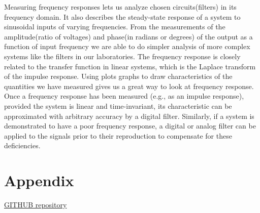 \documentclass[notitlepage, a4paper, 11pt]{article}
\begin{document}
	Measuring frequency responses lets us analyze chosen circuits(filters) in its frequency domain.	It also describes the steady-state response of a system to sinusoidal inputs of varying frequencies. From the measurements of the amplitude(ratio of voltages) and phase(in radians or degrees) of the output as a function of input frequency	we are able to do simpler analysis of more complex systems like the filters in our laboratories. The frequency response is closely related to the transfer function in linear systems, which is the Laplace transform of the impulse response. Using plots graphs to draw characteristics of the quantities we have measured gives us a great way to look at frequency response. Once a frequency response has been measured (e.g., as an impulse response), provided the system is linear and time-invariant, its characteristic can be approximated with arbitrary accuracy by a digital filter. Similarly, if a system is demonstrated to have a poor frequency response, a digital or analog filter can be applied to the signals prior to their reproduction to compensate for these deficiencies.	
	
	\newpage
	\appendix
	\section{Appendix}\label{sec:appendix}
	\href{https://github.com/kamilix2003/CT_labs}{GITHUB repository}
	\inputminted{matlab}{../Matlab/main.m}
	\inputminted{matlab}{../Matlab/import_csv.m}
	\inputminted{matlab}{../Matlab/characteristics.m}
\end{document}
